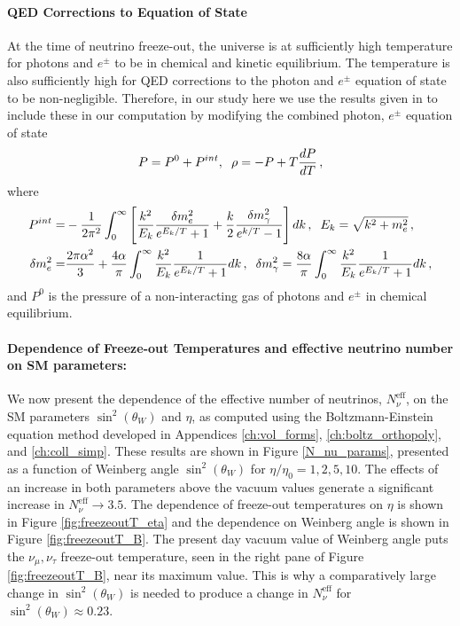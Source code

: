 \paragraph{QED Corrections to Equation of State}\label{app:QED_corr} 
At the time of neutrino freeze-out, the universe is at sufficiently high temperature for photons and $e^\pm$ to be in chemical and kinetic equilibrium.  The temperature is also sufficiently high for QED corrections to the photon and $e^\pm$ equation of state to be non-negligible.  Therefore, in our study here we use the results given in \cite{Heckler:1994tv,Mangano:2001iu} to include these in our computation by modifying the combined photon, $e^\pm$ equation of state
\begin{align}
P=P^0+P^{int},\hspace{2mm} \rho=-P+T\frac{dP}{dT}\,,
\end{align}
where
\begin{align}
P^{int}=&-\frac{1}{2\pi^2}\int_0^\infty\left[\frac{k^2}{E_k}\frac{\delta m_e^2}{e^{E_k/T}+1}+\frac{k}{2}\frac{\delta m_\gamma^2}{e^{k/T}-1}\right]dk\,,\hspace{2mm} E_k=\sqrt{k^2+m_e^2}\,,\\
\delta m_e^2=&\frac{2\pi\alpha^2}{3}+\frac{4\alpha}{\pi}\int_0^\infty \frac{k^2}{E_k}\frac{1}{e^{E_k/T}+1}dk\,,\hspace{2mm} \delta m_\gamma^2=\frac{8\alpha}{\pi}\int_0^\infty \frac{k^2}{E_k}\frac{1}{e^{E_k/T}+1}dk\,,
\end{align}
and $P^0$ is the pressure of a non-interacting gas of photons and $e^\pm$ in chemical equilibrium.


\paragraph{Dependence of Freeze-out Temperatures and effective neutrino number on SM parameters:}
We now present the  dependence of the effective number of neutrinos, $N_\nu^{\mathrm{eff}}$, on  the SM parameters   $\sin^2(\theta_W)$ and $\eta$, as computed using the Boltzmann-Einstein equation method developed in Appendices \ref{ch:vol_forms}, \ref{ch:boltz_orthopoly}, and \ref{ch:coll_simp}. These results are shown in  Figure \ref{N_nu_params}, presented as a function of  Weinberg angle $\sin^2(\theta_W) $ for $\eta/\eta_0=1,2,5,10$. The effects of an increase in both parameters above the vacuum values generate a significant increase in  $N_\nu^{\mathrm{eff}}\to 3.5$.  The dependence of freeze-out temperatures on $\eta$ is shown in Figure \ref{fig:freezeoutT_eta} and the dependence on Weinberg angle is shown in Figure \ref{fig:freezeoutT_B}. The present day vacuum value of Weinberg angle puts the $\nu_\mu,\nu_\tau$ freeze-out temperature, seen in the right pane of Figure \ref{fig:freezeoutT_B},  near its maximum value.  This is why a comparatively large change in $\sin^2(\theta_W)$ is needed to produce a change in $N_\nu^{\mathrm{eff}}$ for $\sin^2(\theta_W)\approx0.23$.  
 
